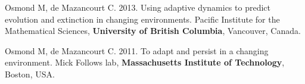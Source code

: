 \documentclass[12pt]{article}
\begin{document}
Osmond M, de Mazancourt C. 2013. Using adaptive dynamics to predict evolution and extinction in changing environments. Pacific Institute for the Mathematical Sciences, \textbf{University of British Columbia}, Vancouver, Canada.


Osmond M, de Mazancourt C. 2011. To adapt and persist in a changing environment. Mick Follows lab, \textbf{Massachusetts Institute of Technology}, Boston, USA.

%
%
%
%
%
%
%
%
%
%
\end{document}
